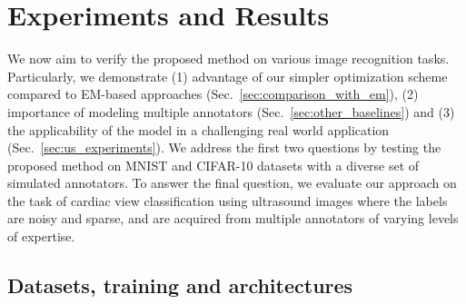 \section{Experiments and Results}

We now aim to verify the proposed method on various image recognition tasks. Particularly, we demonstrate (1) advantage of our simpler optimization scheme compared to EM-based approaches (Sec.~\ref{sec:comparison_with_em}), (2) importance of modeling multiple annotators (Sec.~\ref{sec:other_baselines}) and (3) the applicability of the model in a challenging real world application (Sec.~\ref{sec:us_experiments}). We address the first two questions by testing the proposed method on MNIST and CIFAR-10 datasets with a diverse set of simulated annotators. To answer the final question, we evaluate our approach on the task of cardiac view classification using ultrasound images where the labels are noisy and sparse, and are acquired from multiple annotators of varying levels of expertise. 



\subsection{Datasets, training and architectures}
